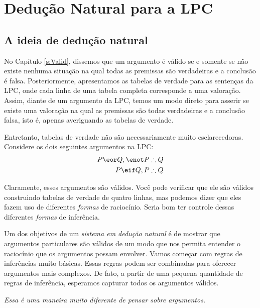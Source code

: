 \part{Dedução Natural para a LPC}
\label{ch.NDTFL}

\chapter{A ideia de dedução natural}\label{s:NDVeryIdea}

No  Capítulo  \ref{s:Valid}, dissemos que um argumento é válido se e somente se não existe nenhuma situação na qual todas as premissas são verdadeiras e a conclusão é falsa. Posteriormente,  apresentamos as tabelas de verdade para as sentenças da LPC, onde  cada linha de uma tabela completa corresponde a uma valoração. Assim, diante de um argumento da LPC,  temos um modo direto para asserir se existe uma valoração na qual as premissas são todas verdadeiras e a conclusão falsa, isto é, apenas averiguando as tabelas de verdade. 

Entretanto, tabelas de verdade não são necessariamente muito esclarecedoras. Considere os dois seguintes argumentos na LPC:
\begin{align*}
P \eor Q, \enot P & \therefore Q\\
P \eif Q, P & \therefore Q
\end{align*}

Claramente, esses argumentos são válidos. Você  pode verificar que ele são válidos construindo tabelas de verdade de quatro linhas, mas podemos dizer que eles fazem uso de diferentes \emph{formas}  de raciocínio. Seria bom ter controle dessas diferentes \emph{formas}  de inferência.

Um dos  objetivos de um  \emph{sistema em dedução natural} é de mostrar que argumentos particulares são  válidos de um modo que nos permita entender o raciocínio que os argumentos possam envolver.  Vamos começar com regras de inferências muito básicas. Essas regras podem ser combinadas para oferecer  argumentos mais complexos.  De fato,  a partir de uma pequena quantidade  de regras de inferência, esperamos capturar todos os argumentos válidos.


\emph{Essa é uma maneira muito diferente de pensar sobre argumentos.} 

